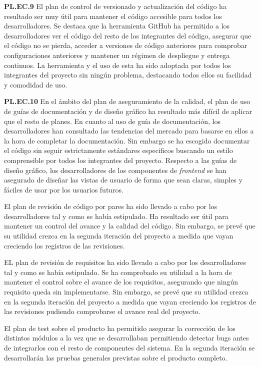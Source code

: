 \documentclass{article}
\begin{document}
\textbf{PL.EC.9}
El plan de control de versionado y actualización del código ha resultado ser muy útil para mantener el código accesible para todos los desarrolladores. Se destaca que la herramienta GitHub ha permitido a los desarrolladores ver el código del resto de los integrantes del código, asegurar que el código no se pierda, acceder a versiones de código anteriores para comprobar configuraciones anteriores y mantener un régimen de despliegue y entrega continuos. La herramienta y el uso de esta ha sido adoptada por todos los integrantes del proyecto sin ningún problema, destacando todos ellos su facilidad y comodidad de uso.

\textbf{PL.EC.10} %
En el ámbito del plan de aseguramiento de la calidad, el plan de uso de guías de documentación y de diseño gráfico ha resultado más difícil de aplicar que el resto de planes. En cuanto al uso de guía de documentación, los desarrolladores han consultado las tendencias del mercado para basarse en ellos a la hora de completar la documentación. Sin embargo se ha escogido documentar el código sin seguir estrictamente estándares especificos buscando un estilo comprensible por todos los integrantes del proyecto. Respecto a las guías de diseño gráfico, los desarrolladores de los componentes de \textit{frontend} se han asegurado de diseñar las vistas de usuario de forma que sean claras, simples y fáciles de usar por los usuarios futuros.

El plan de revisión de código por pares ha sido llevado a cabo por los desarrolladores tal y como se había estipulado. Ha resultado ser útil para mantener un control del avance y la calidad del código. Sin embargo, se prevé que su utilidad crezca en la segunda iteración del proyecto a medida que vayan creciendo los registros de las revisiones.

EL plan de revisión de requisitos ha sido llevado a cabo por los desarrolladores tal y como se había estipulado.
Se ha comprobado su utilidad a la hora de mantener el control sobre el avance de los requisitos, asegurando que ningún requisito queda sin implementarse. Sin embargo, se prevé que su utilidad crezca en la segunda iteración del proyecto a medida que vayan creciendo los registros de las revisiones pudiendo comprobarse el avance real del proyecto.

El plan de test sobre el producto ha permitido asegurar la corrección de los distintos módulos a la vez que se desarrollaban permitiendo detectar bugs antes de integrarlos con el resto de componentes del sistema. En la segunda iteración se desarrollarán las pruebas generales previstas sobre el producto completo.
\end{document}
